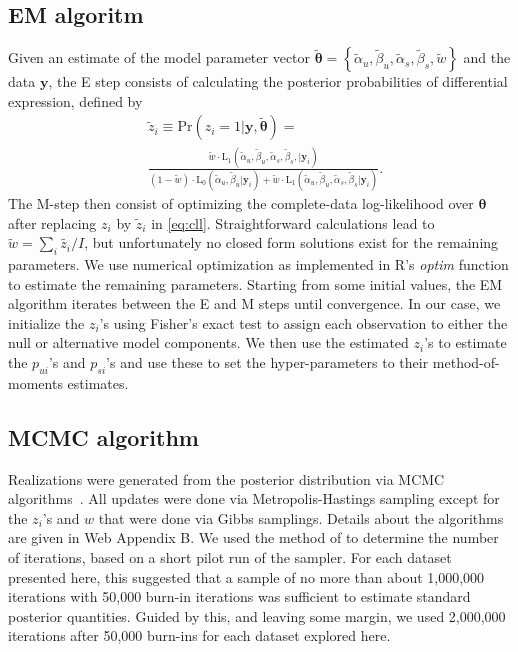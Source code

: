 \documentclass[useAMS,referee,usenatbib]{biom}
\begin{document}
\subsection{EM algoritm}
Given an estimate of the model parameter vector $\tilde{\boldsymbol{\theta}}=\left\{\tilde{\alpha}_u,\tilde{\beta}_u,\tilde{\alpha}_s,\tilde{\beta}_s,\tilde{w}\right\}$ and the data $\mathbf{y}$, the E step consists of calculating the posterior probabilities of differential expression, defined by
\[
\begin{split}
&\tilde z_{i} \equiv \mathrm{Pr}(z_i=1|\mathbf{y},\tilde{\boldsymbol{\theta}})=\\ &\frac{\tilde{w} \cdot \mathrm{L}_1(\tilde{\alpha}_u,\tilde{\beta}_u,\tilde{\alpha}_s,\tilde{\beta}_s,|\mathbf{y}_i)}{(1-\tilde{w})\cdot\mathrm{L}_0(\tilde{\alpha}_u,\tilde{\beta}_u|\mathbf{y}_i)+\tilde{w}\cdot\mathrm{L}_1(\tilde{\alpha}_u,\tilde{\beta}_u,\tilde{\alpha}_s,\tilde{\beta}_s|\mathbf{y}_i)}.
\end{split}
\] 
The M-step then consist of optimizing the complete-data log-likelihood over $\boldsymbol{\theta}$ after replacing $z_i$ by $\tilde{z}_{i}$ in \eqref{eq:cll}. Straightforward calculations lead to 
$\tilde w = \sum_i{\tilde{z_i}}/I$, but unfortunately no closed form solutions exist for the remaining parameters. We use numerical optimization as implemented in R's \textit{optim} function to estimate the remaining parameters.  Starting from some initial values, the EM algorithm iterates between the E and M steps until convergence. In our case, we initialize the $z_{i}$'s using Fisher's exact test to assign each observation to either the null or alternative model components. We then use the estimated $z_i$'s to estimate the $p_{ui}$'s and $p_{si}$'s and use these to set the hyper-parameters to their method-of-moments estimates.

\subsection{MCMC algorithm}
Realizations were generated from the posterior distribution via MCMC algorithms~\citep{Gelfand:1996wc}. All updates were done via Metropolis-Hastings sampling except for the $z_i$'s and $w$ that were done via Gibbs samplings.
Details about the algorithms are given in Web Appendix B. We used the method of \cite{Raftery:1992vp,Raftery:1996ws} to determine the number of iterations, based on a short pilot run of the sampler. For each dataset presented here, this suggested that a sample of no more than about 1,000,000 iterations with 50,000 burn-in iterations was sufficient to estimate standard posterior quantities. Guided by this, and leaving some margin, we used 2,000,000 iterations after 50,000  burn-ins for each dataset explored here. 
\end{document}
